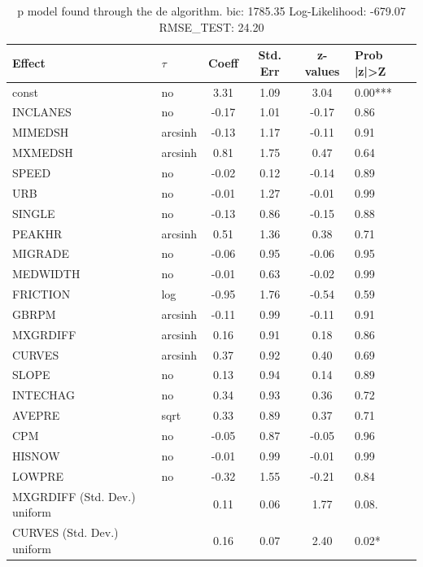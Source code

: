 \begin{table}
	\caption{p model found through the de algorithm. bic: 1785.35 Log-Likelihood: -679.07 RMSE_TEST: 24.20}
	\begin{center}
		\begin{tabular}{|l|l|c|c|c|l|}
			\hline
			Effect & $\tau$ & Coeff & Std. Err & z-values & Prob |z|>Z \\
			\hline
			const & no & 3.31 & 1.09 & 3.04 & 0.00*** \\
			\hline
			INCLANES & no & -0.17 & 1.01 & -0.17 & 0.86 \\
			\hline
			MIMEDSH & arcsinh & -0.13 & 1.17 & -0.11 & 0.91 \\
			\hline
			MXMEDSH & arcsinh & 0.81 & 1.75 & 0.47 & 0.64 \\
			\hline
			SPEED & no & -0.02 & 0.12 & -0.14 & 0.89 \\
			\hline
			URB & no & -0.01 & 1.27 & -0.01 & 0.99 \\
			\hline
			SINGLE & no & -0.13 & 0.86 & -0.15 & 0.88 \\
			\hline
			PEAKHR & arcsinh & 0.51 & 1.36 & 0.38 & 0.71 \\
			\hline
			MIGRADE & no & -0.06 & 0.95 & -0.06 & 0.95 \\
			\hline
			MEDWIDTH & no & -0.01 & 0.63 & -0.02 & 0.99 \\
			\hline
			FRICTION & log & -0.95 & 1.76 & -0.54 & 0.59 \\
			\hline
			GBRPM & arcsinh & -0.11 & 0.99 & -0.11 & 0.91 \\
			\hline
			MXGRDIFF & arcsinh & 0.16 & 0.91 & 0.18 & 0.86 \\
			\hline
			CURVES & arcsinh & 0.37 & 0.92 & 0.40 & 0.69 \\
			\hline
			SLOPE & no & 0.13 & 0.94 & 0.14 & 0.89 \\
			\hline
			INTECHAG & no & 0.34 & 0.93 & 0.36 & 0.72 \\
			\hline
			AVEPRE & sqrt & 0.33 & 0.89 & 0.37 & 0.71 \\
			\hline
			CPM & no & -0.05 & 0.87 & -0.05 & 0.96 \\
			\hline
			HISNOW & no & -0.01 & 0.99 & -0.01 & 0.99 \\
			\hline
			LOWPRE & no & -0.32 & 1.55 & -0.21 & 0.84 \\
			\hline
			MXGRDIFF (Std. Dev.) uniform &  & 0.11 & 0.06 & 1.77 & 0.08. \\
			\hline
			CURVES (Std. Dev.) uniform &  & 0.16 & 0.07 & 2.40 & 0.02* \\

\end{tabular}
\end{center}
\end{table}
